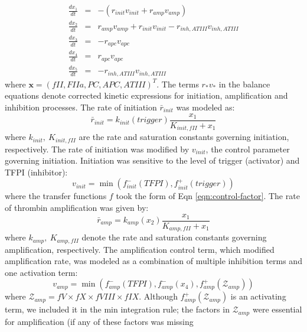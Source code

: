 \documentclass[12pt]{article}
\begin{document}
\begin{eqnarray}
	\frac{dx_{1}}{dt} & =& -\left(r_{init}v_{init} + r_{amp}v_{amp}\right)\\
	\frac{dx_{2}}{dt} &=& r_{amp}v_{amp} + r_{init}v_{init} - r_{inh,ATIII}v_{inh,ATIII}\\
	\frac{dx_{3}}{dt} &=& -r_{apc}v_{apc} \\
	\frac{dx_{4}}{dt} &=& r_{apc}v_{apc} \\
	\frac{dx_{5}}{dt} & = & -r_{inh,ATIII}v_{inh,ATIII}
\end{eqnarray}where $\mathbf{x} = \left(fII,FIIa,PC,APC,ATIII\right)^{T}$. 
The terms $r_{*}v_{*}$ in the balance equations denote corrected kinetic expressions for initiation, amplification and inhibition processes. 
The rate of initiation $\bar{r}_{init}$ was modeled as:
\begin{equation}
	\bar{r}_{init} = k_{init}\left(trigger\right)\frac{x_{1}}{K_{init,fII} + x_{1}}
\end{equation}where $k_{init},~K_{init,fII}$ are the rate and saturation constants governing initiation, respectively. 
The rate of initiation was modified by $v_{init}$, the control parameter governing initiation. 
Initiation was sensitive to the level of trigger (activator) and TFPI (inhibitor):
\begin{equation}
	v_{init} = \min\left(f^{-}_{init}\left(TFPI\right),f^{+}_{init}\left(trigger\right)\right)
\end{equation}where the transfer functions $f$ took the form of Eqn \eqref{eqn:control-factor}.
The rate of thrombin amplification was given by:
\begin{equation}
	\bar{r}_{amp} = k_{amp}\left(x_{2}\right)\frac{x_{1}}{K_{amp,fII}+x_{1}}
\end{equation}where $k_{amp},~K_{amp,fII}$ denote the rate and saturation constants governing amplification, respectively. 
The amplification control term, which modified amplification rate, was modeled as a combination of multiple inhibition terms and one activation term:
\begin{equation}
	v_{amp} = \min\left(f^{-}_{amp}\left(TFPI\right),f^{-}_{amp}\left(x_{4}\right),f^{+}_{amp}\left(\mathcal{Z}_{amp}\right)\right)
\end{equation}where $\mathcal{Z}_{amp} = fV\times fX\times fVIII\times fIX$. Although $f^{+}_{amp}\left(\mathcal{Z}_{amp}\right)$ is an activating term, 
we included it in the min integration rule; the factors in $\mathcal{Z}_{amp}$ were essential for amplification (if any of these factors was missing
\end{document}
